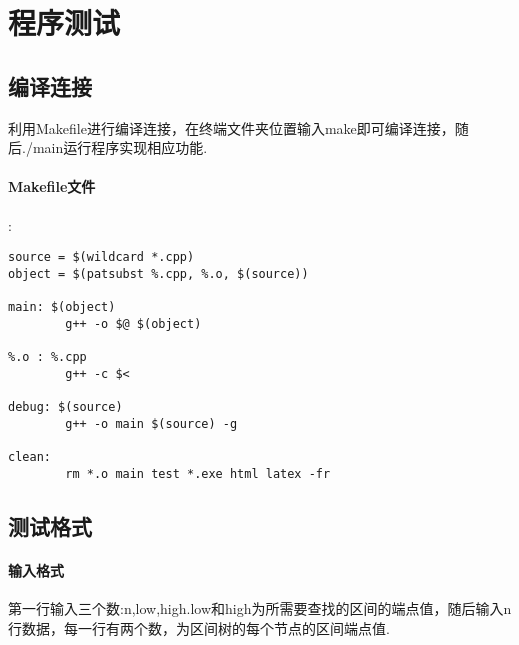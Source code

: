 \documentclass{article}
\begin{document}
\section{程序测试}
\subsection{编译连接}
利用Makefile进行编译连接，在终端文件夹位置输入make即可编译连接，随后./main运行程序实现相应功能.
\paragraph{Makefile文件}:
\begin{lstlisting}
source = $(wildcard *.cpp)
object = $(patsubst %.cpp, %.o, $(source))

main: $(object)
        g++ -o $@ $(object)

%.o : %.cpp
        g++ -c $<

debug: $(source)
        g++ -o main $(source) -g

clean:
        rm *.o main test *.exe html latex -fr
\end{lstlisting}

\subsection{测试格式}
\paragraph{输入格式}
第一行输入三个数:n,low,high.low和high为所需要查找的区间的端点值，随后输入n行数据，每一行有两个数，为区间树的每个节点的区间端点值.
\end{document}
